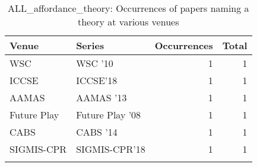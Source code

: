 \begin{table*}[t]
\begin{tabular}{llrr}
Venue & Series & Occurrences & Total\\\hline
\multirow{1}{*}{WSC } & WSC '10 & 1 & \multirow{1}{*}{1}\\
\multirow{1}{*}{ICCSE} & ICCSE'18 & 1 & \multirow{1}{*}{1}\\
\multirow{1}{*}{AAMAS } & AAMAS '13 & 1 & \multirow{1}{*}{1}\\
\multirow{1}{*}{Future Play } & Future Play '08 & 1 & \multirow{1}{*}{1}\\
\multirow{1}{*}{CABS } & CABS '14 & 1 & \multirow{1}{*}{1}\\
\multirow{1}{*}{SIGMIS-CPR} & SIGMIS-CPR'18 & 1 & \multirow{1}{*}{1}\\
\caption{ALL_affordance_theory: Occurrences of papers naming a theory at various venues}
\end{tabular}
\end{table*}